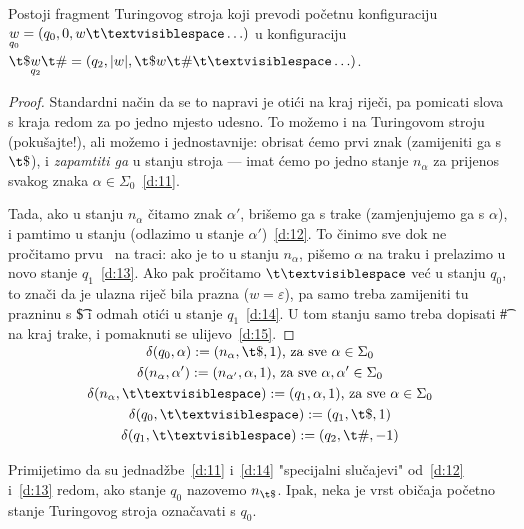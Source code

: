 \begin{lema}\label{lm:faza1}
Postoji fragment Turingovog stroja koji prevodi početnu konfiguraciju $\underset{q_0}{w}=(q_0,0,w\bl\ldots)$ u konfiguraciju $\t\$\underset{q_2}{w}\t\#=(q_2,\dulj{w},\t\$w\t\#\bl\ldots)$.
\end{lema}
\begin{proof}
Standardni način da se to napravi je otići na kraj riječi, pa pomicati slova s kraja redom za po jedno mjesto udesno. To možemo i na Turingovom stroju (pokušajte!), ali možemo i jednostavnije: obrisat ćemo prvi znak (zamijeniti ga s $\t\$$), i \emph{zapamtiti ga} u stanju stroja --- imat ćemo po jedno stanje $n_\alpha$ za prijenos svakog znaka $\alpha\in\Sigma_0$~\eqref{d:11}.

Tada, ako u stanju $n_\alpha$ čitamo znak $\alpha'$, brišemo ga s trake (zamjenjujemo ga s $\alpha$), i pamtimo u stanju (odlazimo u stanje $\alpha'$)~\eqref{d:12}. To činimo sve dok ne pročitamo prvu \bl\ na traci: ako je to u stanju $n_\alpha$, pišemo $\alpha$ na traku i prelazimo u novo stanje $q_1$~\eqref{d:13}. Ako pak pročitamo $\bl$ već u stanju $q_0$, to znači da je ulazna riječ bila prazna ($w=\varepsilon$), pa samo treba zamijeniti tu prazninu s \t\$ i odmah otići u stanje $q_1$~\eqref{d:14}. U tom stanju samo treba dopisati \t\# na kraj trake, i pomaknuti se ulijevo~\eqref{d:15}.
\end{proof}
\noindent\begin{gather}
    \SwapAboveDisplaySkip
\label{d:11}
    \delta(q_0,\alpha):=(n_\alpha,\t\$,1)\text{, za sve }\alpha\in\Sigma_0\\
\label{d:12}
    \delta(n_\alpha,\alpha'):=(n_{\alpha'},\alpha,1)\text{, za sve }\alpha,\alpha'\in\Sigma_0\\
\label{d:13}
    \delta(n_\alpha,\bl):=(q_1,\alpha,1)\text{, za sve }\alpha\in\Sigma_0\\
\label{d:14}
    \delta(q_0,\bl):=(q_1,\t\$,1)\\
\label{d:15}
    \delta(q_1,\bl):=(q_2,\t\#,-1)
\end{gather}

Primijetimo da su jednadžbe~\eqref{d:11} i~\eqref{d:14} "specijalni slučajevi" od~\eqref{d:12} i~\eqref{d:13} redom, ako stanje $q_0$ nazovemo $n_{\t\$}$. Ipak, neka je vrst običaja početno stanje Turingovog stroja označavati s $q_0$.

